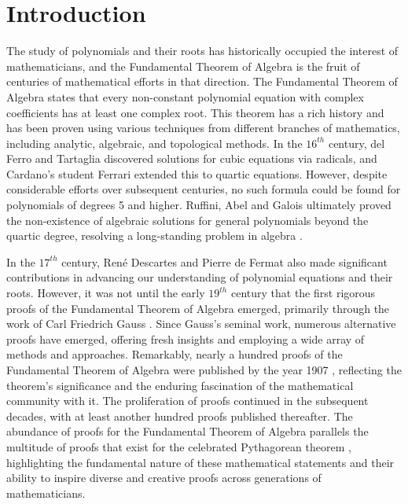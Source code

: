 \documentclass[sn-mathphys-num]{sn-jnl}%
\begin{document}
\section{Introduction}
The study of polynomials and their roots has historically occupied the interest of mathematicians, and the Fundamental Theorem of Algebra is the fruit of centuries of mathematical efforts in that direction. The Fundamental Theorem of Algebra states that every non-constant polynomial equation with complex coefficients has at least one complex root. This theorem has a rich history and has been proven using various techniques from different branches of mathematics, including analytic, algebraic, and topological methods. In the $16^{th}$ century, del Ferro and Tartaglia discovered solutions for cubic equations via radicals, and Cardano's student Ferrari extended this to quartic equations. However, despite considerable efforts over subsequent centuries, no such formula could be found for polynomials of degrees 5 and higher. Ruffini, Abel and Galois ultimately proved the non-existence of algebraic solutions for general polynomials beyond the quartic degree, resolving a long-standing problem in algebra \cite{boyer2012history, edwards1984galois}.

\medskip
  
  In the $17^{th}$ century, René Descartes and Pierre de Fermat also made significant contributions in advancing our  understanding of polynomial equations and their roots. However, it was not until the early $19^{th}$ century that the first rigorous proofs of the Fundamental Theorem of Algebra emerged, primarily through the work of Carl Friedrich Gauss \cite{gaussproof, stillwell2010mathematics}. Since Gauss's seminal work, numerous alternative proofs have emerged, offering fresh insights and employing a wide array of methods and approaches. Remarkably, nearly a hundred proofs of the Fundamental Theorem of Algebra were published by the year 1907 \cite{Remmert1995}, reflecting the theorem's significance and the enduring fascination of the mathematical community with it. The proliferation of proofs continued in the subsequent decades, with at least another hundred proofs published thereafter.
  The abundance of proofs for the Fundamental Theorem of Algebra parallels the multitude of proofs that exist for the celebrated Pythagorean theorem \cite{Maor2007}, highlighting the fundamental nature of these mathematical statements and their ability to inspire diverse and creative proofs across generations of mathematicians.
\medskip
\end{document}
